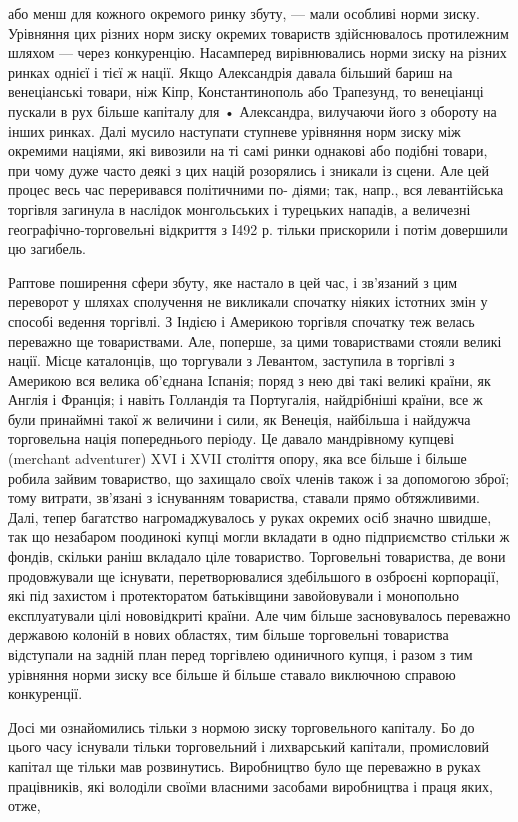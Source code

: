 \parcont{}  %
або менш для кожного окремого ринку збуту, — мали особливі норми зиску. Урівняння цих різних норм зиску окремих товариств здійснювалось протилежним шляхом — через конкуренцію. Насамперед вирівнювались норми зиску на різних ринках однієї і тієї ж
нації. Якщо Александрія давала більший бариш на венеціанські товари, ніж Кіпр, Константинополь або Трапезунд, то венеціанці
пускали в рух більше капіталу для • Александра, вилучаючи його з обороту на інших ринках. Далі мусило наступати ступневе
урівняння норм зиску між окремими націями, які вивозили на ті самі ринки однакові або подібні товари, при чому дуже часто
деякі з цих націй розорялись і зникали із сцени. Але цей процес весь час переривався політичними по- діями; так, напр., вся
левантійська торгівля загинула в наслідок монгольських і турецьких нападів, а величезні географічно-торговельні відкриття з
І492 р. тільки прискорили і потім довершили цю загибель.

Раптове поширення сфери збуту, яке настало в цей час, і зв’язаний з
цим переворот у шляхах сполучення не викликали спочатку ніяких істотних змін у способі ведення торгівлі. З Індією і Америкою
торгівля спочатку теж велась переважно ще товариствами. Але, поперше, за цими товариствами стояли великі нації. Місце
каталонців, що торгували з Левантом, заступила в торгівлі з Америкою вся велика об’єднана Іспанія; поряд з нею дві такі
великі країни, як Англія і Франція; і навіть Голландія та Португалія, найдрібніші країни, все ж були принаймні такої ж
величини і сили, як Венеція, найбільша і найдужча торговельна нація попереднього періоду. Це давало мандрівному купцеві (merchant adventurer) XVI і XVII століття опору, яка все більше і більше робила зайвим товариство, що захищало своїх членів
також і за допомогою зброї; тому витрати, зв’язані з існуванням товариства, ставали прямо обтяжливими. Далі, тепер багатство
нагромаджувалось у руках окремих осіб значно швидше, так що незабаром поодинокі купці могли вкладати в одно підприємство
стільки ж фондів, скільки раніш вкладало ціле товариство. Торговельні товариства, де вони продовжували ще існувати,
перетворювалися здебільшого в озброєні корпорації, які під захистом і протекторатом батьківщини завойовували і монопольно
експлуатували цілі нововідкриті країни. Але чим більше засновувалось переважно державою колоній в нових областях, тим більше
торговельні товариства відступали на задній план перед торгівлею одиничного купця, і разом з тим урівняння норми зиску все
більше й більше ставало виключною справою конкуренції.

Досі ми ознайомились тільки з нормою зиску торговельного капіталу. Бо
до цього часу існували тільки торговельний і лихварський капітали, промисловий капітал ще тільки мав розвинутись.
Виробництво було ще переважно в руках працівників, які володіли своїми власними засобами виробництва і праця яких, отже,
\parbreak{}  %
